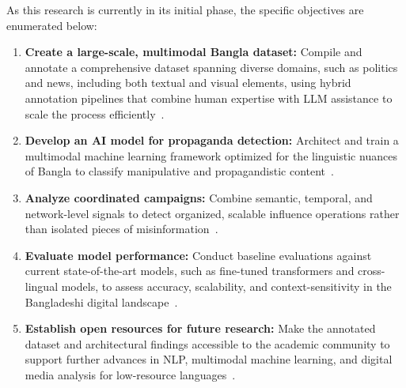 \documentclass[12pt,a4paper]{report}
\begin{document}
As this research is currently in its initial phase, the specific objectives are
enumerated below:
\begin{enumerate}
  \item \textbf{Create a large-scale, multimodal Bangla dataset:} Compile and
        annotate a comprehensive dataset spanning diverse domains, such as politics
        and news, including both textual and visual elements, using hybrid
        annotation pipelines that combine human expertise with LLM assistance to
        scale the process efficiently~\cite{hossain2020}.
  \item \textbf{Develop an AI model for propaganda detection:} Architect and train
        a multimodal machine learning framework optimized for the linguistic
        nuances of Bangla to classify manipulative and propagandistic
        content~\cite{hossain2020}.
  \item \textbf{Analyze coordinated campaigns:} Combine semantic, temporal, and
        network-level signals to detect organized, scalable influence operations
        rather than isolated pieces of misinformation~\cite{ng2023}.
  \item \textbf{Evaluate model performance:} Conduct baseline evaluations against
        current state-of-the-art models, such as fine-tuned transformers and
        cross-lingual models, to assess accuracy, scalability, and
        context-sensitivity in the Bangladeshi digital landscape~\cite{hossain2020}.
  \item \textbf{Establish open resources for future research:} Make the annotated
        dataset and architectural findings accessible to the academic community to
        support further advances in NLP, multimodal machine learning, and digital
        media analysis for low-resource languages~\cite{hossain2020}.
\end{enumerate}
\end{document}
